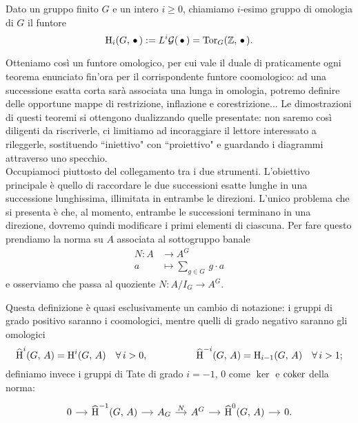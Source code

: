 \begin{definition}
	Dato un gruppo finito $ G $ e un intero $ i \geq 0 $, chiamiamo $ i $-esimo gruppo di omologia di $ G $ il funtore
	\[ \operatorname{H}_i(G, \, \bullet \,) := L^i\mathcal{G}(\, \bullet \,) = \operatorname{Tor}_G(\mathbb{Z}, \, \bullet \, ). \]
\end{definition}

Otteniamo così un funtore omologico, per cui vale il duale di praticamente ogni teorema enunciato fin'ora per il corrispondente funtore coomologico: ad una successione esatta corta sarà associata una lunga in omologia, potremo definire delle opportune mappe di restrizione, inflazione e corestrizione... Le dimostrazioni di questi teoremi si ottengono dualizzando quelle presentate: non saremo così diligenti da riscriverle, ci limitiamo ad incoraggiare il lettore interessato a rileggerle, sostituendo \textquotedblleft iniettivo" con \textquotedblleft proiettivo" e guardando i diagrammi attraverso uno specchio.  \\

Occupiamoci piuttosto del collegamento tra i due strumenti. L'obiettivo principale è quello di raccordare le due successioni esatte lunghe in una successione lunghissima, illimitata in entrambe le direzioni. L'unico problema che si presenta è che, al momento, entrambe le successioni terminano in una direzione, dovremo quindi modificare i primi elementi di ciascuna. Per fare questo prendiamo la norma su $ A $ associata al sottogruppo banale
\begin{align*}
N \colon A  & \to A^G \\
a & \mapsto \sum_{g \in G} \, g \cdot a
\end{align*}
e osserviamo che passa al quoziente $ N \colon A/I_G \to A^G $. 

\begin{definition}
	Questa definizione è quasi esclusivamente un cambio di notazione: i gruppi di grado positivo saranno i coomologici, mentre quelli di grado negativo saranno gli omologici
	\[ \operatorname{\widehat{H}}^i(G, \, A) = \operatorname{H}^i(G, \, A) \quad \forall\, i > 0, \qquad\quad\qquad \operatorname{\widehat{H}}^{-i}(G, \, A) = \operatorname{H}_{i-1}(G, \, A) \quad \forall\, i > 1;
	 \]
	 definiamo invece i gruppi di Tate di grado $ i = -1, \, 0 $ come $ \ker $ e $ \operatorname{coker} $ della norma:
	 \begin{equation}
	 	\begin{tikzcd}[column sep = small]
	 	0 \rar& \Hh^{-1}(G, \, A) \rar& A_G \rar["N"]& A^G \rar&\Hh^0(G, \, A) \rar& 0.
	 	\end{tikzcd}
	 \end{equation}
\end{definition}

